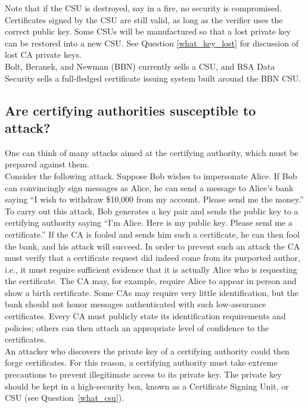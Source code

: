 Note that if the CSU is destroyed, say in a fire, no security is
compromised. Certificates signed by the CSU are still valid, as long as the
verifier uses the correct public key. Some CSUs will be manufactured so
that a lost private key can be restored into a new CSU.  See Question
\ref{what_key_lost} for discussion of lost CA private keys.\\

Bolt, Beranek, and Newman (BBN) currently sells a CSU, and RSA Data
Security sells a full-fledged certificate issuing system built around
the BBN CSU.

\subsection{Are certifying authorities susceptible to attack?}
\label{cert_attac}

One can think of many attacks aimed at the certifying authority, which
must be prepared against them.\\

Consider the following attack. Suppose Bob wishes to impersonate Alice.
If Bob can convincingly sign messages as Alice, he can send a message
to Alice's bank saying ``I wish to withdraw \$10,000 from my account.
Please send me the money.'' To carry out this attack, Bob generates a
key pair and sends the public key to a certifying authority saying
``I'm Alice. Here is my public key. Please send me a certificate.'' If
the CA is fooled and sends him such a certificate, he can then fool the
bank, and his attack will succeed. In order to prevent such an attack
the CA must verify that a certificate request did indeed come from its
purported author, i.e., it must require sufficient evidence that it is
actually Alice who is requesting the certificate. The CA may, for
example, require Alice to appear in person and show a birth
certificate. Some CAs may require very little identification, but the
bank should not honor messages authenticated with such low-assurance
certificates. Every CA must publicly state its identification
requirements and policies; others can then attach an appropriate level
of confidence to the certificates.\\

An attacker who discovers the private key of a certifying authority could
then forge certificates. For this reason, a certifying authority must take
extreme precautions to prevent illegitimate access to its private key. The
private key should be kept in a high-security box, known as a Certificate
Signing Unit, or CSU (see Question~\ref{what_csu}).\\

